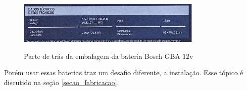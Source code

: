 \begin{figure}[ht]
	\centering
	\caption{Parte de trás da embalagem da bateria Bosch GBA 12v}
	\includegraphics[width=0.8\textwidth]{figures/gba_bosch_embalagem}
	\label{gba_bosch_embalagem}
\end{figure}

Porém usar essas baterias traz um desafio diferente, a instalação.  Esse tópico é discutido na seção \ref{secao_fabricacao}.

